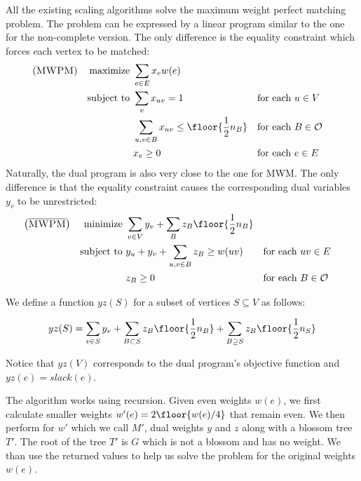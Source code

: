 All the existing scaling algorithms solve the maximum weight perfect matching problem. The problem can be expressed by a linear program similar to the one for the non-complete version. The only difference is the equality constraint which forces each vertex to be matched:
\begin{align*}
\left(\textsc{MWPM}\right) && \text{maximize }   & \sum_{e \in E} x_e w(e)\\
&& \text{subject to } & \sum_v x_{uv} = 1 && \text{for each $u \in V$} \\
&& & \sum_{u, v \in B} x_{uv} \leq \floor{\frac{1}{2}n_B} && \text{for each $B \in \mathcal{O}$} \\
&& & x_e \geq 0           && \text{for each $e \in E$}
\end{align*}
Naturally, the dual program is also very close to the one for \textsc{MWM}. The only difference is that the equality constraint causes the corresponding dual variables $y_v$ to be unrestricted:
\begin{align*}
\left(\overline{\textsc{MWPM}}\right) &&\text{minimize }   & \sum_{v\in V}y_v + \sum_{B} z_B \floor{\frac{1}{2}n_B} \\
&& \text{subject to } & y_u + y_v + \sum_{u, v \in B} z_B \geq w(uv) && \text{for each $uv \in E$} \\
&& & z_B \geq 0          && \text{for each $B \in \mathcal{O}$}
\end{align*}

We define a function $yz(S)$ for a subset of vertices $S \subseteq V$ as follows:

\[
yz(S) = \sum_{v \in S} y_v + \sum_{B \subset S} z_B \floor{\frac{1}{2}n_B} + \sum_{B \supseteq S} z_B \floor{\frac{1}{2}n_S}
\]

Notice that $yz(V)$ corresponds to the dual program's objective function and $yz(e) = slack(e)$.

The algorithm works using recursion. Given even weights $w(e)$, we first calculate smaller weights $w'(e) = 2\floor{ w(e)/4 }$ that remain even. We then perform for $w'$ which we call $M'$, dual weights $y$ and $z$ along with a blossom tree $T'$. The root of the tree $T'$ is $G$ which is not a blossom and has no weight. We than use the returned values to help us solve the problem for the original weights $w(e)$.

\renewcommand{\labelenumi}{\textbf{\arabic{enumi}}.}

